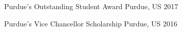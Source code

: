 




\begin{cvachs}
    \cvach
    {Purdue's Outstanding Student Award} %
    {Purdue, US} %
    {2017} %

    \cvach
    {Purdue's Vice Chancellor Scholarship} %
    {Purdue, US} %
    {2016} %
    
\end{cvachs}
